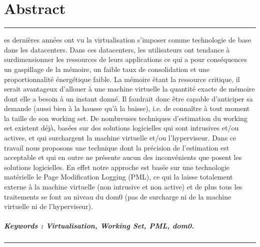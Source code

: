 %
%
%

\chapter*{Abstract}
{
\setstretch{}
\noindent\rule[3pt]{\textwidth}{1pt}
\vspace{.2cm}

es dernières années ont vu la virtualisation s'imposer comme technologie de base dans les datacenters. Dans ces datacenters, les utilisateurs ont tendance à surdimensionner les ressources de leurs applications ce qui a pour conséquences un gaspillage de la mémoire, un faible taux de consolidation et une proportionnalité énergétique faible. La mémoire étant la ressource critique, il serait avantageux d’allouer à une machine virtuelle la quantité exacte de mémoire dont elle a besoin à un instant donné. Il faudrait donc être capable d’anticiper sa demande (aussi bien à la hausse qu’à la baisse), i.e. de connaître à tout moment la taille de son working set. De nombreuses techniques d'estimation du working set existent déjà, basées sur des solutions logicielles qui sont intrusives et/ou actives, et qui surchargent la machine virtuelle et/ou l'hyperviseur. Dans ce travail nous proposons une technique dont la précision de l'estimation est acceptable et qui en outre ne présente aucun des inconvénients que posent les solutions logicielles. En effet notre approche est basée sur une technologie matérielle le Page Modification Logging (PML), ce qui la laisse totalement externe à la machine virtuelle (non intrusive et non active) et de plus tous les traitements se font au niveau du dom0 (pas de surcharge ni de la machine virtuelle ni de l'hyperviseur). 

\paragraph{Keywords : Virtualisation, Working Set, PML, dom0.}

\vspace{.2cm}
\noindent\rule[3pt]{\textwidth}{1pt}
}
\clearpage